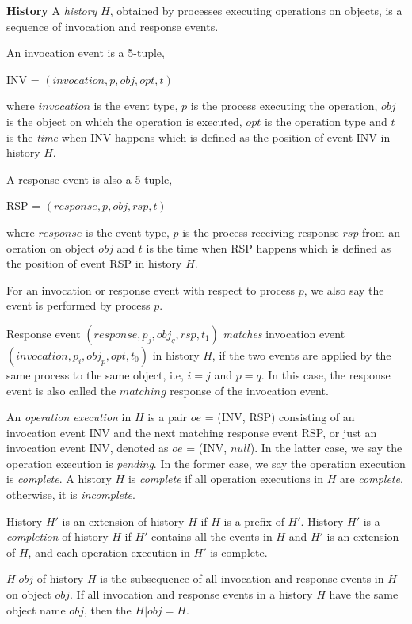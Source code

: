 \textbf{History}
A \emph{history} $H$, obtained by processes executing
operations on objects, is a sequence of invocation
and response events.

An invocation event is a 5-tuple,
\begin{center}
INV = $(invocation, p, obj, opt, t)$
\end{center}
where $invocation$ is the event type, $p$ is the process executing the operation, $obj$ is the object on which the operation
is executed, $opt$ is the operation type and $t$ is the \emph{time} when INV happens which is defined
as the position of event INV in history $H$.

A response event is also a 5-tuple,
\begin{center}
RSP = $(response, p, obj, rsp, t)$
\end{center}
where $response$ is the event type, $p$ is the process receiving response $rsp$ from an oeration on object $obj$ and $t$
is the time when RSP happens which is defined as the position of event RSP in history $H$.

For an invocation or response event with respect to process $p$, we also say the event is performed by process $p$.

Response event $(response, p_j, obj_q, rsp, t_1)$ \emph{matches} invocation event $(invocation, p_i, obj_p, opt, t_0)$
in history $H$, if the two events are applied by the same process to the same object, i.e, $i = j$ and $p = q$.
In this case, the response event is also called the $matching$ response of the invocation event.

An \emph{operation execution} in $H$ is a pair $oe$ = (INV, RSP) consisting of an invocation event INV
and the next matching response event RSP, or just an invocation event INV, denoted as $oe$ = (INV, $null$).
In the latter case, we say the operation execution is \emph{pending}. In the former case, we say the operation
execution is \emph{complete}. A history $H$ is \emph{complete} if all operation executions in $H$ are \emph{complete},
otherwise, it is \emph{incomplete}.

History $H'$ is an extension of history $H$ if $H$ is a prefix of $H'$.
History $H'$ is a \emph{completion} of history $H$ if $H'$ contains all the
events in $H$ and $H'$ is an extension of $H$, and each operation execution in $H'$ is complete.

$H|obj$ of history $H$ is the subsequence of all
invocation and response events in $H$ on object $obj$. If all invocation and response
events in a history $H$ have the same object name $obj$, then the $H|obj = H$.

